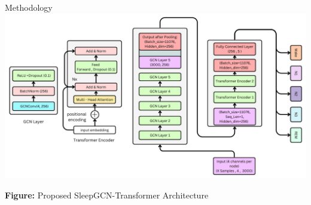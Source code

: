 \begin{frame}{Methodology}
    \centering
    \includegraphics[width=0.85\linewidth]{images/paper_3/Graph Convolution Neural Network -SleepGCN_Transformer Architechture} %

        \small \textbf{Figure:} Proposed SleepGCN-Transformer Architecture %
\end{frame}

